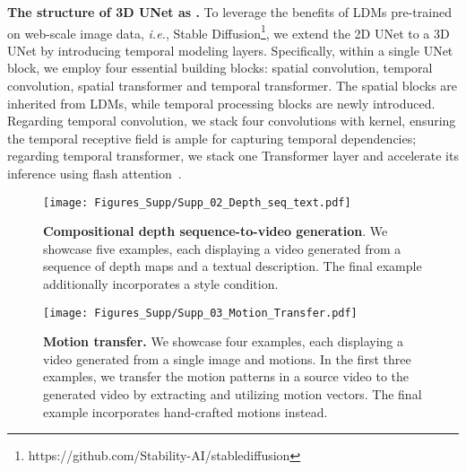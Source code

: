 \textbf{The structure of 3D UNet as .}
To leverage the benefits of LDMs pre-trained on web-scale image data, \textit{i.e.}, Stable Diffusion\footnote{https://github.com/Stability-AI/stablediffusion}, we extend the 2D UNet to a 3D UNet by introducing temporal modeling layers.
Specifically, within a single UNet block, we employ four essential building blocks: spatial convolution, temporal convolution, spatial transformer and temporal transformer.
The spatial blocks are inherited from LDMs, while temporal processing blocks are newly introduced.
Regarding temporal convolution, we stack four convolutions with  kernel, ensuring the temporal receptive field is ample for capturing temporal dependencies;
regarding temporal transformer, we stack one Transformer layer 
and accelerate its inference using flash attention~\cite{dao2022flashattention}.













\begin{figure}[t]
    \centering
    \texttt{[image: Figures\_Supp/Supp\_02\_Depth\_seq\_text.pdf]}
     \vspace{-1.5em}
    \caption{
    \small
    \textbf{Compositional depth sequence-to-video generation}.
    We showcase five examples, each displaying a video generated from a sequence of depth maps and a textual description.
    The final example additionally incorporates a style condition.
    }
    \label{fig:depth_sequence}
    \vspace{-5mm}
\end{figure}




\begin{figure}[t]
    \centering
    \texttt{[image: Figures\_Supp/Supp\_03\_Motion\_Transfer.pdf]}
     \vspace{-1.5em}
    \caption{
    \small
    \textbf{Motion transfer.}
We showcase four examples, each displaying a video generated from a single image and motions.
In the first three examples, we transfer the motion patterns in a source video to the generated video by extracting and utilizing motion vectors.
The final example incorporates hand-crafted motions instead.
    }
    \label{fig:motion_transfer}
    \vspace{-5mm}
\end{figure}


